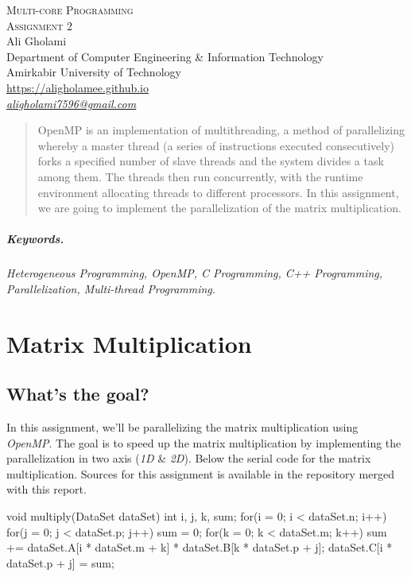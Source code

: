 \documentclass[12pt]{article}
\numberwithin{equation}{section}
\numberwithin{table}{section}
\numberwithin{figure}{section}
\begin{document}

\begin{center}
\textsc{\Huge Multi-core Programming} \\[2pt]
	\textsc{\Large Assignment 2}\\
	\vspace{0.5cm}
  Ali Gholami \\[6pt]
  Department of Computer Engineering \& Information Technology\\
  Amirkabir University of Technology  \\[6pt]
  \def\UrlFont{\em}
  \url{https://aligholamee.github.io}\\
\href{mailto:aligholami7596@gmail.com}{\textit{aligholami7596@gmail.com}}
\end{center}

\begin{abstract}
OpenMP is an implementation of multithreading, a method of parallelizing whereby a master thread (a series of instructions executed consecutively) forks a specified number of slave threads and the system divides a task among them. The threads then run concurrently, with the runtime environment allocating threads to different processors. In this assignment, we are going to implement the parallelization of the matrix multiplication.
\end{abstract} 

\subparagraph{Keywords.} \textit{Heterogeneous Programming, OpenMP, C Programming, C++ Programming, Parallelization, Multi-thread Programming.}

\section{Matrix Multiplication}
\subsection{What's the goal?}
In this assignment, we'll be parallelizing the matrix multiplication using \textit{OpenMP}. The goal is to speed up the matrix multiplication by implementing the parallelization in two axis (\textit{1D} \& \textit{2D}). Below the serial code for the matrix multiplication. Sources for this assignment is available in the repository merged with this report.

\begin{cpp}
		void multiply(DataSet dataSet){
			int i, j, k, sum;
			for(i = 0; i < dataSet.n; i++){
				for(j = 0; j < dataSet.p; j++){
					sum = 0;
					for(k = 0; k < dataSet.m; k++){
						sum += dataSet.A[i * dataSet.m + k] * dataSet.B[k * dataSet.p + j];
					}
					dataSet.C[i * dataSet.p + j] = sum;
				}
			}
		}
\end{cpp}
\end{document}
